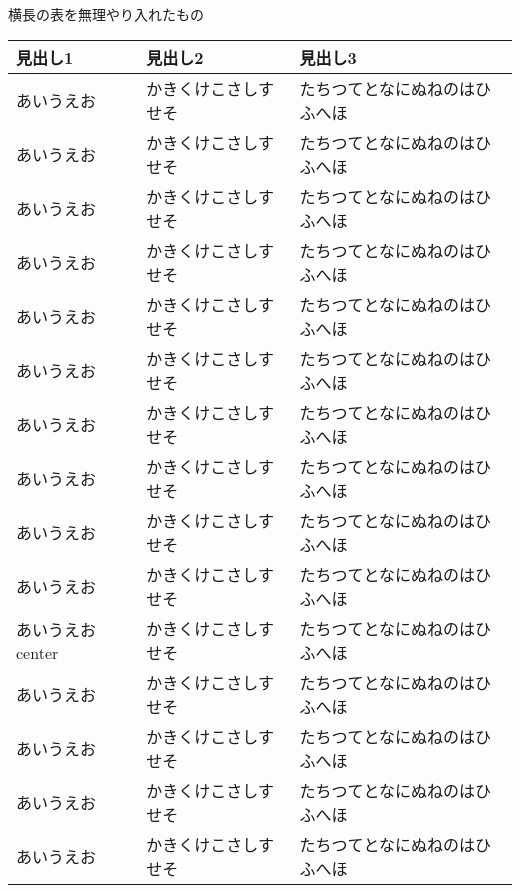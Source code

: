 \documentclass{jsce}
\makeatletter
\def\labelx#1#2{\@bsphack %
  \protected@write\@auxout{}%
         {\string\newlabel{#1}{{#2}{\thepage}}}%
  \@esphack}
\makeatother
\begin{document}
\noindent
 ~ %
%
%
\hfill
\begin{minipage}[c]{.95\textwidth}
\begin{center}
\addtocounter{table}{1} %
{\small
{\bf \tablename\nobreak\thetable} 横長の表を無理やり入れたもの
}\\[5mm] %
\labelx{tab:landscape}{\thetable} %
\begin{tabular}{|p{6cm}|p{8cm}|p{8cm}|} \hline
見出し1 & 見出し2 & 見出し3 \\ \hline\hline
あいうえお & かきくけこさしすせそ & たちつてとなにぬねのはひふへほ \\ \hline
あいうえお & かきくけこさしすせそ & たちつてとなにぬねのはひふへほ \\ \hline
あいうえお & かきくけこさしすせそ & たちつてとなにぬねのはひふへほ \\ \hline
あいうえお & かきくけこさしすせそ & たちつてとなにぬねのはひふへほ \\ \hline
あいうえお & かきくけこさしすせそ & たちつてとなにぬねのはひふへほ \\ \hline
あいうえお & かきくけこさしすせそ & たちつてとなにぬねのはひふへほ \\ \hline
あいうえお & かきくけこさしすせそ & たちつてとなにぬねのはひふへほ \\ \hline
あいうえお & かきくけこさしすせそ & たちつてとなにぬねのはひふへほ \\ \hline
あいうえお & かきくけこさしすせそ & たちつてとなにぬねのはひふへほ \\ \hline
あいうえお & かきくけこさしすせそ & たちつてとなにぬねのはひふへほ \\ \hline
あいうえお center & かきくけこさしすせそ & たちつてとなにぬねのはひふへほ \\ \hline
あいうえお & かきくけこさしすせそ & たちつてとなにぬねのはひふへほ \\ \hline
あいうえお & かきくけこさしすせそ & たちつてとなにぬねのはひふへほ \\ \hline
あいうえお & かきくけこさしすせそ & たちつてとなにぬねのはひふへほ \\ \hline
あいうえお & かきくけこさしすせそ & たちつてとなにぬねのはひふへほ \\ \hline

\end{tabular}
\end{center}
\end{minipage}
\end{document}
